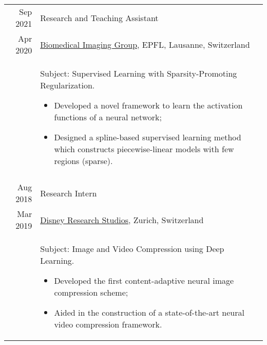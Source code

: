 \begin{tabular}{r|p{\tabwidth}}

  {\small Sep 2021} 	& Research and Teaching Assistant \\[\datespace]
  {\small Apr 2020} 	& {\small \href{https://bigwww.epfl.ch/}{Biomedical Imaging Group}, EPFL, Lausanne, Switzerland} \\[\title-main-sep]
  & {
    \parbox[t]{\tabwidth}{
    \footnotesize Subject: Supervised Learning with Sparsity-Promoting Regularization.
    \begin{itemize}[topsep=0pt, partopsep=0pt, parsep=0pt, itemsep=0pt, leftmargin=*, after=\vspace{0pt}]
      \item Developed a novel framework to learn the activation functions of a neural network;
      \item Designed a spline-based supervised learning method which constructs piecewise-linear models with few regions (sparse).
    \end{itemize}
    }
  } \\
  \multicolumn{2}{c}{} \\

  {\small Aug 2018} & Research Intern \\[\datespace]
  {\small Mar 2019} &  {\small \href{https://studios.disneyresearch.com/}{Disney Research Studios}, Zurich, Switzerland}\\[\title-main-sep]
        & {
    \parbox[t]{\tabwidth}{
    \footnotesize Subject: Image and Video Compression using Deep Learning.
    \begin{itemize}[topsep=0pt, partopsep=0pt, parsep=0pt, itemsep=0pt, leftmargin=*, after=\vspace{0pt}]
      \item Developed the first content-adaptive neural image compression scheme;
      \item Aided in the construction of a state-of-the-art neural video compression framework.
    \end{itemize}
    }
  }
\end{tabular}
